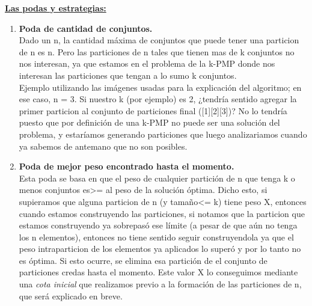 \documentclass[10pt,a4paper]{article}
\begin{document}
\underline{\textbf{Las podas y estrategias:}}

\begin{enumerate}
\item \textbf{Poda de cantidad de conjuntos.}\\
Dado un n, la cantidad máxima de conjuntos que puede tener una particion de n es n. Pero las particiones de n tales que tienen mas de k conjuntos no nos interesan, ya que estamos en el problema de la k-PMP donde nos interesan las particiones que tengan a lo sumo k conjuntos.\\
Ejemplo utilizando las imágenes usadas para la explicación del algoritmo; en ese caso, n = 3. Si nuestro k (por ejemplo) es 2, ¿tendría sentido agregar la primer particion al conjunto de particiones final ([1][2][3])? No lo tendría puesto que por definición de una k-PMP no puede ser una solución del problema, y estaríamos generando particiones que luego analizariamos cuando ya sabemos de antemano que no son posibles.\\

\item \textbf{Poda de mejor peso encontrado hasta el momento.}\\
Esta poda se basa en que el peso de cualquier partición de n que tenga k o menos conjuntos es\textgreater = al peso de la solución óptima.
Dicho esto, si supieramos que alguna particion de n (y tamaño\textless = k) tiene peso X, entonces cuando estamos construyendo las particiones, si notamos que la particion que estamos construyendo ya sobrepasó ese límite (a pesar de que aún no tenga los n elementos), entonces no tiene sentido seguir construyendola ya que el peso intraparticion de los elementos ya aplicados lo superó y por lo tanto no es óptima. Si esto ocurre, se elimina esa partición de el conjunto de particiones credas hasta el momento.
Este valor X lo conseguimos mediante una \textit{cota inicial} que realizamos previo a la formación de las particiones de n, que será explicado en breve.\\


\end{enumerate}
\end{document}
